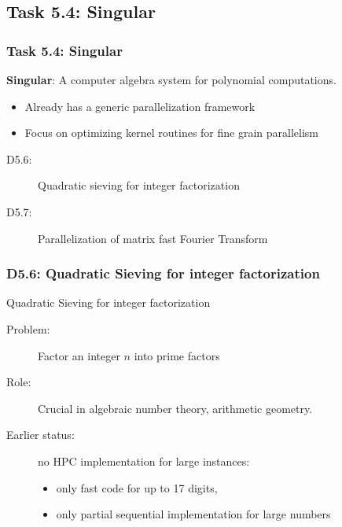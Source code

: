 \documentclass{beamer}
\begin{document}
\subsection{Task 5.4: Singular}
\begin{frame}
  \frametitle{Task 5.4: Singular}
\begin{center}{\Large
    \textbf{Singular}: A computer algebra system for polynomial computations.}
\end{center}

  \begin{itemize}
  \item Already has a generic parallelization framework
  \item Focus on optimizing  kernel routines for fine grain parallelism
  \end{itemize}

  \begin{description}
  \item[D5.6:] Quadratic sieving for integer factorization
  \item[D5.7:] Parallelization of matrix fast Fourier Transform
  \end{description}
\end{frame}
\begin{frame}
  \frametitle{D5.6: Quadratic Sieving for integer factorization}

  \begin{block}{Quadratic Sieving for integer factorization}
    \begin{description}
    \item[Problem:]  Factor an integer $n$ into prime factors
    \item[Role:] Crucial in algebraic number theory, arithmetic geometry.
    \item [Earlier status:] no HPC implementation for large instances:
      \begin{itemize}
      \item only fast code for up to 17 digits,
      \item only partial sequential implementation for large numbers
      \end{itemize}
    \end{description}
    \end{block}
\end{frame}
\end{document}
